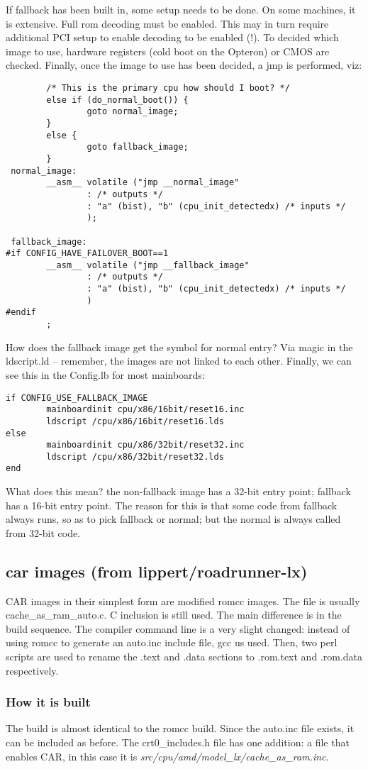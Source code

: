 \documentclass[titlepage,12pt]{article}
\begin{document}
If fallback has been built in, some setup needs to be done. On some machines, it is extensive. Full rom decoding must be enabled. This may in turn require additional PCI setup to enable decoding to be enabled (!). To decided which image to use, hardware registers (cold boot on the Opteron) or CMOS are checked. Finally, once the image to use has been decided, a jmp is performed, viz:
\begin{verbatim}
        /* This is the primary cpu how should I boot? */
        else if (do_normal_boot()) {
                goto normal_image;
        }
        else {
                goto fallback_image;
        }
 normal_image:
        __asm__ volatile ("jmp __normal_image"
                : /* outputs */
                : "a" (bist), "b" (cpu_init_detectedx) /* inputs */
                );

 fallback_image:
#if CONFIG_HAVE_FAILOVER_BOOT==1
        __asm__ volatile ("jmp __fallback_image"
                : /* outputs */
                : "a" (bist), "b" (cpu_init_detectedx) /* inputs */
                )
#endif
        ;
\end{verbatim}
How does the fallback image get the symbol for normal entry? Via magic in the ldscript.ld -- remember, the images are not linked to each other.
Finally, we can see this in the Config.lb for most mainboards:
\begin{verbatim}
if CONFIG_USE_FALLBACK_IMAGE
        mainboardinit cpu/x86/16bit/reset16.inc
        ldscript /cpu/x86/16bit/reset16.lds
else
        mainboardinit cpu/x86/32bit/reset32.inc
        ldscript /cpu/x86/32bit/reset32.lds
end
\end{verbatim}
What does this mean? the non-fallback image has a 32-bit entry point; fallback has a 16-bit entry point. The reason for this is that some code from fallback always runs, so as to pick fallback or normal; but the normal is always called from 32-bit code.
\subsection{car images (from lippert/roadrunner-lx)}
CAR images in their simplest form are modified romcc images. The file is usually cache\_as\_ram\_auto.c. C inclusion is still used. The main difference is in the build sequence. The compiler command line is a very slight changed: instead of using romcc to generate an auto.inc include file, gcc us used. Then, two perl scripts are used to rename the .text and .data sections to .rom.text and .rom.data respectively.
\subsubsection{How it is built}
The build is almost identical to the romcc build. Since the auto.inc file exists, it can be included as before. The crt0\_includes.h file has one addition: a file that enables CAR, in this case it is \textit{src/cpu/amd/model\_lx/cache\_as\_ram.inc}.
\end{document}
